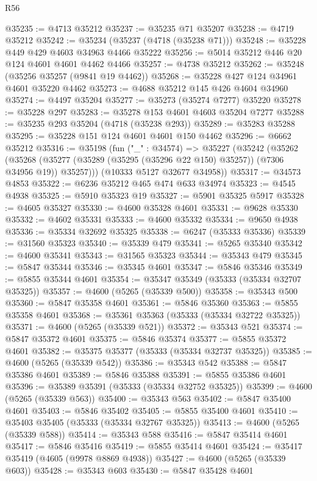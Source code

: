 \begin{lexlean}{R56}
\begin{coremodule}
@35235 := @4713 @35212
@35237 := @35235 @71 @35207
@35238 := @4719 @35212
@35242 := @35234 (@35237 (@4718 (@35238 @71)))
@35248 := @35228 @449 @429 @4603 @34963 @4466 @35222
@35256 := @5014 @35212 @446 @20 @124 @4601 @4601 @4462 @4466
@35257 := @4738 @35212
@35262 := @35248 (@35256 @35257 (@9841 @19 @4462))
@35268 := @35228 @427 @124 @34961 @4601 @35220 @4462
@35273 := @4688 @35212 @145 @426 @4604 @34960
@35274 := @4497 @35204
@35277 := @35273 (@35274 @7277) @35220
@35278 := @35228 @297
@35283 := @35278 @153 @4601 @4603 @35204 @7277
@35288 := @35235 @293 @35204 (@4718 (@35238 @293))
@35289 := @35283 @35288
@35295 := @35228 @151 @124 @4601 @4601 @150 @4462
@35296 := @6662 @35212
@35316 := @35198
    (fun ("_" : @34574) =>
    @35227
      (@35242
        (@35262
          (@35268 (@35277 (@35289 (@35295 (@35296 @22 @150) @35257)) (@7306 @34956 @19)) @35257)))
      (@10333 @5127 @32677 @34958))
@35317 := @34573 @4853
@35322 := @6236 @35212 @465 @474 @633 @34974
@35323 := @4545 @4938
@35325 := @5910 @35323 @19
@35327 := @5901 @35325 @5917
@35328 := @4605 @35327
@35330 := @4600 @35328 @4601
@35331 := @9628 @35330
@35332 := @4602 @35331
@35333 := @4600 @35332
@35334 := @9650 @4938
@35336 := @35334 @32692 @35325
@35338 := @6247 (@35333 @35336)
@35339 := @31560 @35323
@35340 := @35339 @479
@35341 := @5265 @35340
@35342 := @4600 @35341
@35343 := @31565 @35323
@35344 := @35343 @479
@35345 := @5847 @35344
@35346 := @35345 @4601
@35347 := @5846 @35346
@35349 := @5855 @35344 @4601
@35354 := @35347 @35349 (@35333 (@35334 @32707 @35325))
@35357 := @4600 (@5265 (@35339 @500))
@35358 := @35343 @500
@35360 := @5847 @35358 @4601
@35361 := @5846 @35360
@35363 := @5855 @35358 @4601
@35368 := @35361 @35363 (@35333 (@35334 @32722 @35325))
@35371 := @4600 (@5265 (@35339 @521))
@35372 := @35343 @521
@35374 := @5847 @35372 @4601
@35375 := @5846 @35374
@35377 := @5855 @35372 @4601
@35382 := @35375 @35377 (@35333 (@35334 @32737 @35325))
@35385 := @4600 (@5265 (@35339 @542))
@35386 := @35343 @542
@35388 := @5847 @35386 @4601
@35389 := @5846 @35388
@35391 := @5855 @35386 @4601
@35396 := @35389 @35391 (@35333 (@35334 @32752 @35325))
@35399 := @4600 (@5265 (@35339 @563))
@35400 := @35343 @563
@35402 := @5847 @35400 @4601
@35403 := @5846 @35402
@35405 := @5855 @35400 @4601
@35410 := @35403 @35405 (@35333 (@35334 @32767 @35325))
@35413 := @4600 (@5265 (@35339 @588))
@35414 := @35343 @588
@35416 := @5847 @35414 @4601
@35417 := @5846 @35416
@35419 := @5855 @35414 @4601
@35424 := @35417 @35419 (@4605 (@9978 @8869 @4938))
@35427 := @4600 (@5265 (@35339 @603))
@35428 := @35343 @603
@35430 := @5847 @35428 @4601

\end{coremodule}
\end{lexlean}
